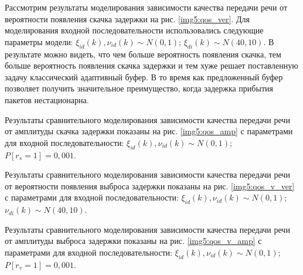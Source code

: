 Рассмотрим результаты моделирования зависимости качества передачи речи от вероятности появления скачка задержки на рис. \ref{img5:qos_ver}.
Для моделирования входной последовательности использовались следующие параметры модели:
$\xi_{id}(k),\nu_{id}(k)\sim N(0,1)$; $\xi_{di}(k)\sim N(40,10)$.
В результате можно видеть, что чем больше вероятность появления скачка, тем больше вероятность появления скачка задержки и тем хуже решает поставленную задачу классический адаптивный буфер.
В то время как предложенный буфер позволяет получить значительное преимущество, когда задержка прибытия пакетов нестационарна.

Результаты сравнительного моделирования зависимости качества передачи речи от амплитуды скачка задержки показаны на рис. \ref{img5:qos_amp} с параметрами для входной последовательности:
$\xi_{id}(k),\nu_{id}(k)\sim N(0,1)$; $P[r_s=1]=0,001$.

Результаты сравнительного моделирования зависимости качества передачи речи от вероятности появления выброса задержки показаны на рис. \ref{img5:qos_v_ver} с параметрами для входной последовательности:
$\xi_{id}(k),\nu_{id}(k)\sim N(0,1)$; $\nu_{di}(k)\sim N(40,10)$.

Результаты сравнительного моделирования зависимости качества передачи речи от амплитуды выброса задержки показаны на рис. \ref{img5:qos_v_amp} с параметрами для входной последовательности:
$\xi_{id}(k),\nu_{id}(k)\sim N(0,1)$; $P[r_v=1]=0,001$.


